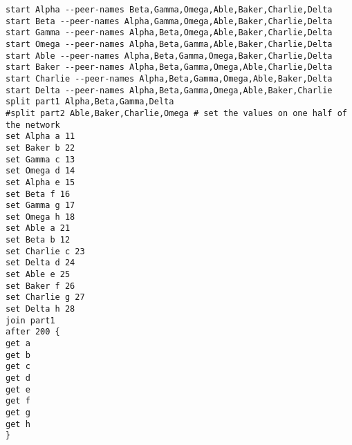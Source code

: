\documentclass[11pt]{article}
\begin{document}
\begin{lstlisting}[language={}, caption={Partition Merge Test Script}, basicstyle=\ttfamily, label=lst:Merge]
start Alpha --peer-names Beta,Gamma,Omega,Able,Baker,Charlie,Delta 
start Beta --peer-names Alpha,Gamma,Omega,Able,Baker,Charlie,Delta 
start Gamma --peer-names Alpha,Beta,Omega,Able,Baker,Charlie,Delta 
start Omega --peer-names Alpha,Beta,Gamma,Able,Baker,Charlie,Delta 
start Able --peer-names Alpha,Beta,Gamma,Omega,Baker,Charlie,Delta 
start Baker --peer-names Alpha,Beta,Gamma,Omega,Able,Charlie,Delta 
start Charlie --peer-names Alpha,Beta,Gamma,Omega,Able,Baker,Delta 
start Delta --peer-names Alpha,Beta,Gamma,Omega,Able,Baker,Charlie  
split part1 Alpha,Beta,Gamma,Delta
#split part2 Able,Baker,Charlie,Omega # set the values on one half of the network
set Alpha a 11
set Baker b 22
set Gamma c 13
set Omega d 14
set Alpha e 15
set Beta f 16
set Gamma g 17
set Omega h 18
set Able a 21
set Beta b 12
set Charlie c 23
set Delta d 24
set Able e 25
set Baker f 26
set Charlie g 27
set Delta h 28
join part1
after 200 {
get a
get b
get c
get d
get e
get f
get g
get h
}
\end{lstlisting}
\end{document}
